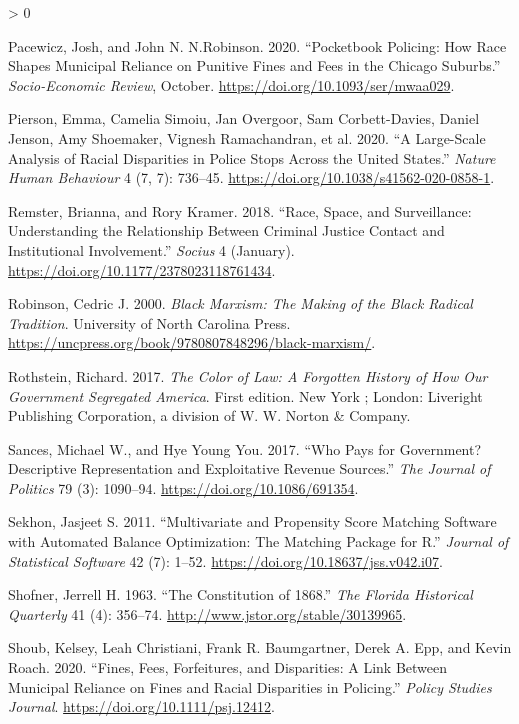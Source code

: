 \documentclass[
  12pt,
]{article}
\newlength{\cslhangindent}
\newenvironment{CSLReferences}[2] %
 {%
  \setlength{\parindent}{0pt}
  \ifodd #1 \everypar{\setlength{\hangindent}{\cslhangindent}}\ignorespaces\fi
  \ifnum #2 > 0
  \setlength{\parskip}{#2\baselineskip}
  \fi
 }%
 {}
\begin{document}
\begin{CSLReferences}{1}{0}
\leavevmode\hypertarget{ref-Pacewicz2020}{}%
Pacewicz, Josh, and John N. N.Robinson. 2020. {``Pocketbook Policing: {How} Race Shapes Municipal Reliance on Punitive Fines and Fees in the {Chicago} Suburbs.''} \emph{Socio-Economic Review}, October. \url{https://doi.org/10.1093/ser/mwaa029}.

\leavevmode\hypertarget{ref-Pierson2020}{}%
Pierson, Emma, Camelia Simoiu, Jan Overgoor, Sam Corbett-Davies, Daniel Jenson, Amy Shoemaker, Vignesh Ramachandran, et al. 2020. {``A Large-Scale Analysis of Racial Disparities in Police Stops Across the {United States}.''} \emph{Nature Human Behaviour} 4 (7, 7): 736--45. \url{https://doi.org/10.1038/s41562-020-0858-1}.

\leavevmode\hypertarget{ref-Remster2018a}{}%
Remster, Brianna, and Rory Kramer. 2018. {``Race, {Space}, and {Surveillance}: {Understanding} the {Relationship} Between {Criminal Justice Contact} and {Institutional Involvement}.''} \emph{Socius} 4 (January). \url{https://doi.org/10.1177/2378023118761434}.

\leavevmode\hypertarget{ref-Robinson2000}{}%
Robinson, Cedric J. 2000. \emph{Black {Marxism}: The {Making} of the {Black Radical Tradition}}. {University of North Carolina Press}. \url{https://uncpress.org/book/9780807848296/black-marxism/}.

\leavevmode\hypertarget{ref-Rothstein2017}{}%
Rothstein, Richard. 2017. \emph{The Color of Law: A Forgotten History of How Our Government Segregated {America}}. First edition. {New York ; London}: {Liveright Publishing Corporation, a division of W. W. Norton \& Company}.

\leavevmode\hypertarget{ref-Sances2017}{}%
Sances, Michael W., and Hye Young You. 2017. {``Who {Pays} for {Government}? {Descriptive Representation} and {Exploitative Revenue Sources}.''} \emph{The Journal of Politics} 79 (3): 1090--94. \url{https://doi.org/10.1086/691354}.

\leavevmode\hypertarget{ref-Sekhon2011}{}%
Sekhon, Jasjeet S. 2011. {``Multivariate and {Propensity Score Matching Software} with {Automated Balance Optimization}: {The Matching} Package for {R}.''} \emph{Journal of Statistical Software} 42 (7): 1--52. \url{https://doi.org/10.18637/jss.v042.i07}.

\leavevmode\hypertarget{ref-Shofner1963}{}%
Shofner, Jerrell H. 1963. {``The {Constitution} of 1868.''} \emph{The Florida Historical Quarterly} 41 (4): 356--74. \url{http://www.jstor.org/stable/30139965}.

\leavevmode\hypertarget{ref-Shoub2020}{}%
Shoub, Kelsey, Leah Christiani, Frank R. Baumgartner, Derek A. Epp, and Kevin Roach. 2020. {``Fines, {Fees}, {Forfeitures}, and {Disparities}: {A Link Between Municipal Reliance} on {Fines} and {Racial Disparities} in {Policing}.''} \emph{Policy Studies Journal}. \url{https://doi.org/10.1111/psj.12412}.


\end{CSLReferences}
\end{document}
